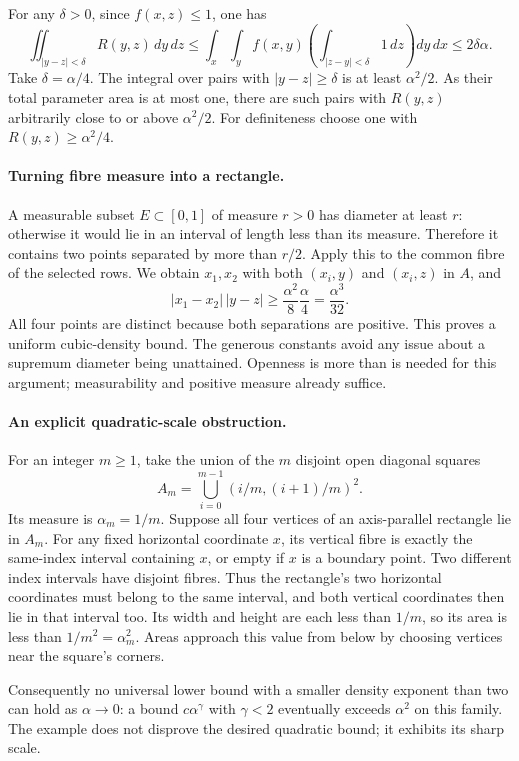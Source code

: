 \documentclass[11pt,a4paper]{article}
\begin{document}
For any $\delta>0$, since $f(x,z)\leq1$, one has
\[
 \iint_{|y-z|<\delta}R(y,z)\,dy\,dz
 \leq\int_x\int_y f(x,y)\left(\int_{|z-y|<\delta}1\,dz\right)dy\,dx
 \leq2\delta\alpha.
\]
Take $\delta=\alpha/4$. The integral over pairs with $|y-z|\geq\delta$ is at least $\alpha^2/2$. As their total parameter area is at most one, there are such pairs with $R(y,z)$ arbitrarily close to or above $\alpha^2/2$. For definiteness choose one with $R(y,z)\geq\alpha^2/4$.

\paragraph{Turning fibre measure into a rectangle.}
A measurable subset $E\subset[0,1]$ of measure $r>0$ has diameter at least $r$: otherwise it would lie in an interval of length less than its measure. Therefore it contains two points separated by more than $r/2$. Apply this to the common fibre of the selected rows. We obtain $x_1,x_2$ with both $(x_i,y)$ and $(x_i,z)$ in $A$, and
\[
 |x_1-x_2|\,|y-z|\geq\frac{\alpha^2}{8}\frac\alpha4
 =\frac{\alpha^3}{32}.
\]
All four points are distinct because both separations are positive. This proves a uniform cubic-density bound. The generous constants avoid any issue about a supremum diameter being unattained. Openness is more than is needed for this argument; measurability and positive measure already suffice.

\paragraph{An explicit quadratic-scale obstruction.}
For an integer $m\geq1$, take the union of the $m$ disjoint open diagonal squares
\[
 A_m=\bigcup_{i=0}^{m-1}(i/m,(i+1)/m)^2.
\]
Its measure is $\alpha_m=1/m$. Suppose all four vertices of an axis-parallel rectangle lie in $A_m$. For any fixed horizontal coordinate $x$, its vertical fibre is exactly the same-index interval containing $x$, or empty if $x$ is a boundary point. Two different index intervals have disjoint fibres. Thus the rectangle's two horizontal coordinates must belong to the same interval, and both vertical coordinates then lie in that interval too. Its width and height are each less than $1/m$, so its area is less than $1/m^2=\alpha_m^2$. Areas approach this value from below by choosing vertices near the square's corners.

Consequently no universal lower bound with a smaller density exponent than two can hold as $\alpha\to0$: a bound $c\alpha^\gamma$ with $\gamma<2$ eventually exceeds $\alpha^2$ on this family. The example does not disprove the desired quadratic bound; it exhibits its sharp scale.
\end{document}
